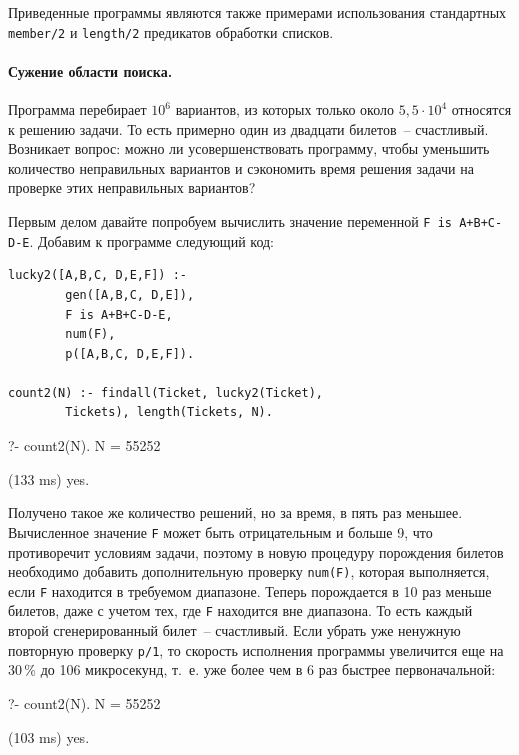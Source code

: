 \documentclass[a4paper,14pt, openany, twoside, final]{extbook} %
\begin{document}
Приведенные программы являются также примерами использования стандартных \texttt{member/2} и \texttt{length/2} предикатов обработки списков.

\paragraph{Сужение области поиска.} Программа перебирает $10^6$ вариантов, из которых только около $5,5\cdot 10^4$ относятся к решению задачи. То есть примерно один из двадцати билетов~-- счастливый. Возникает вопрос: можно ли усовершенствовать программу, чтобы уменьшить количество неправильных вариантов и сэкономить время решения задачи на проверке этих неправильных вариантов?

Первым делом давайте попробуем вычислить значение переменной \texttt{F is A+B+C-D-E}. Добавим к программе следующий код:

\begin{verbatim}
lucky2([A,B,C, D,E,F]) :-
        gen([A,B,C, D,E]),
        F is A+B+C-D-E,
        num(F),
        p([A,B,C, D,E,F]).

count2(N) :- findall(Ticket, lucky2(Ticket),
        Tickets), length(Tickets, N).
\end{verbatim}

\begin{proexp}
?- count2(N).
N = 55252

(133 ms) yes.
\end{proexp}

Получено такое же количество решений, но за время, в пять раз меньшее. Вычисленное значение \texttt{F} может быть отрицательным и больше 9, что противоречит условиям задачи, поэтому в новую процедуру порождения билетов необходимо добавить дополнительную проверку \texttt{num(F)}, которая выполняется, если \texttt{F} находится в требуемом диапазоне. Теперь порождается в 10 раз меньше билетов, даже с учетом тех, где \texttt{F} находится вне диапазона. То есть каждый второй сгенерированный билет~-- счастливый.  Если убрать уже ненужную повторную проверку \texttt{p/1}, то скорость исполнения программы увеличится еще на 30\,{}\% до 106 микросекунд, т.~е. уже более чем в 6 раз быстрее первоначальной:

\begin{proexp}
?- count2(N).
N = 55252

(103 ms) yes.
\end{proexp}
\end{document}
